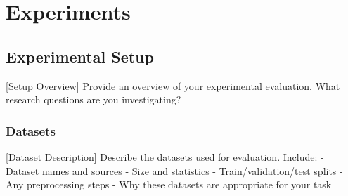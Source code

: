 \section{Experiments}
\label{sec:experiments}

\subsection{Experimental Setup}
\label{sec:setup}

[Setup Overview] Provide an overview of your experimental evaluation. What research questions are you investigating?


\subsubsection{Datasets}
\label{sec:datasets}

[Dataset Description] Describe the datasets used for evaluation. Include:
- Dataset names and sources
- Size and statistics
- Train/validation/test splits
- Any preprocessing steps
- Why these datasets are appropriate for your task



